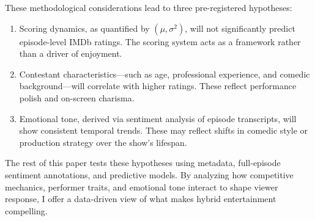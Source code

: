 \documentclass[10pt,letterpaper]{article}
\begin{document}
These methodological considerations lead to three pre-registered hypotheses:

\begin{enumerate}
  \item Scoring dynamics, as quantified by $(\mu, \sigma^2)$, will not significantly predict episode-level IMDb ratings. The scoring system acts as a framework rather than a driver of enjoyment.
  \item Contestant characteristics—such as age, professional experience, and comedic background—will correlate with higher ratings. These reflect performance polish and on-screen charisma.
  \item Emotional tone, derived via sentiment analysis of episode transcripts, will show consistent temporal trends. These may reflect shifts in comedic style or production strategy over the show's lifespan.
\end{enumerate}

The rest of this paper tests these hypotheses using metadata, full-episode sentiment annotations, and predictive models. By analyzing how competitive mechanics, performer traits, and emotional tone interact to shape viewer response, I offer a data-driven view of what makes hybrid entertainment compelling.
\end{document}

